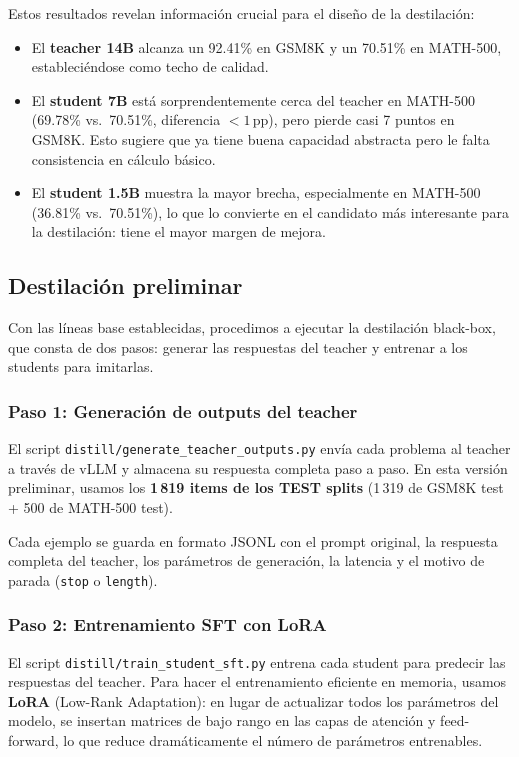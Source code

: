\documentclass[11pt,a4paper]{article}
\begin{document}
Estos resultados revelan informaci\'on crucial para el dise\~no de la
destilaci\'on:

\begin{itemize}
  \item El \textbf{teacher 14B} alcanza un 92.41\% en GSM8K y un
    70.51\% en MATH-500, estableci\'endose como techo de calidad.
  \item El \textbf{student 7B} est\'a sorprendentemente cerca del
    teacher en MATH-500 (69.78\% vs.\ 70.51\%, diferencia $< 1$\,pp),
    pero pierde casi 7 puntos en GSM8K. Esto sugiere que ya tiene buena
    capacidad abstracta pero le falta consistencia en c\'alculo b\'asico.
  \item El \textbf{student 1.5B} muestra la mayor brecha, especialmente
    en MATH-500 (36.81\% vs.\ 70.51\%), lo que lo convierte en el
    candidato m\'as interesante para la destilaci\'on: tiene el mayor
    margen de mejora.
\end{itemize}

\subsection{Destilaci\'on preliminar}

Con las l\'ineas base establecidas, procedimos a ejecutar la
destilaci\'on black-box, que consta de dos pasos: generar las
respuestas del teacher y entrenar a los students para imitarlas.

\subsubsection{Paso 1: Generaci\'on de outputs del teacher}

El script \texttt{distill/generate\_teacher\_outputs.py} env\'ia cada
problema al teacher a trav\'es de vLLM y almacena su respuesta completa
paso a paso. En esta versi\'on preliminar, usamos los \textbf{1\,819
items de los TEST splits} (1\,319 de GSM8K test + 500 de MATH-500 test).

Cada ejemplo se guarda en formato JSONL con el prompt original, la
respuesta completa del teacher, los par\'ametros de generaci\'on, la
latencia y el motivo de parada (\texttt{stop} o \texttt{length}).

\subsubsection{Paso 2: Entrenamiento SFT con LoRA}

El script \texttt{distill/train\_student\_sft.py} entrena cada student
para predecir las respuestas del teacher. Para hacer el entrenamiento
eficiente en memoria, usamos \textbf{LoRA} (Low-Rank Adaptation): en
lugar de actualizar todos los par\'ametros del modelo, se insertan
matrices de bajo rango en las capas de atenci\'on y feed-forward, lo
que reduce dram\'aticamente el n\'umero de par\'ametros entrenables.
\end{document}
